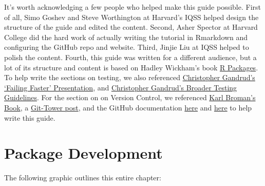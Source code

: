 \documentclass[]{book}
\begin{document}
It's worth acknowledging a few people who helped make this guide
possible. First of all, Simo Goshev and Steve Worthington at Harvard's
IQSS helped design the structure of the guide and edited the content.
Second, Asher Spector at Harvard College did the hard work of actually
writing the tutorial in Rmarkdown and configuring the GitHub repo and
website. Third, Jinjie Liu at IQSS helped to polish the content. Fourth,
this guide was written for a different audience, but a lot of its
structure and content is based on Hadley Wickham's book
\href{http://r-pkgs.had.co.nz/}{R Packages}. To help write the sections
on testing, we also referenced
\href{http://slides.com/christophergandrud/failing-faster\#/24}{Christopher
Gandrud's `Failing Faster' Presentation}, and
\href{https://github.com/IQSS/social_science_software_toolkit/blob/master/testing/recommended_testing_tools_R.md\#recommended-testing-tools-and-process-for-r-packages}{Christopher
Gandrud's Broader Testing Guidelines}. For the section on on Version
Control, we referenced \href{https://kbroman.org/github_tutorial/}{Karl
Broman's Book}, a
\href{https://www.git-tower.com/learn/git/faq/restore-repo-to-previous-revision}{Git-Tower
post}, and the GitHub documentation
\href{https://git-scm.com/book/en/v2/Getting-Started-Git-Basics}{here}
and
\href{https://git-scm.com/book/en/v2/Getting-Started-First-Time-Git-Setup}{here}
to help write this guide.

\chapter{Package Development}\label{package-development}

The following graphic outlines this entire chapter:
\end{document}
